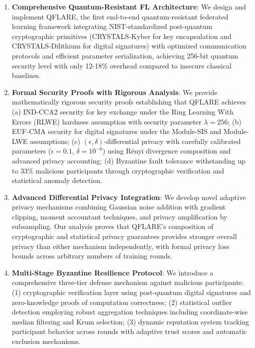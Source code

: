 \documentclass[journal]{IEEEtran}
\begin{document}
\begin{enumerate}
\item \textbf{Comprehensive Quantum-Resistant FL Architecture}: We design and implement QFLARE, the first end-to-end quantum-resistant federated learning framework integrating NIST-standardized post-quantum cryptographic primitives (CRYSTALS-Kyber for key encapsulation and CRYSTALS-Dilithium for digital signatures) with optimized communication protocols and efficient parameter serialization, achieving 256-bit quantum security level with only 12-18\% overhead compared to insecure classical baselines.

\item \textbf{Formal Security Proofs with Rigorous Analysis}: We provide mathematically rigorous security proofs establishing that QFLARE achieves (a) IND-CCA2 security for key exchange under the Ring Learning With Errors (RLWE) hardness assumption with security parameter $\lambda = 256$; (b) EUF-CMA security for digital signatures under the Module-SIS and Module-LWE assumptions; (c) $(\epsilon, \delta)$-differential privacy with carefully calibrated parameters ($\epsilon = 0.1$, $\delta = 10^{-6}$) using Rényi divergence composition and advanced privacy accounting; (d) Byzantine fault tolerance withstanding up to 33\% malicious participants through cryptographic verification and statistical anomaly detection.

\item \textbf{Advanced Differential Privacy Integration}: We develop novel adaptive privacy mechanisms combining Gaussian noise addition with gradient clipping, moment accountant techniques, and privacy amplification by subsampling. Our analysis proves that QFLARE's composition of cryptographic and statistical privacy guarantees provides stronger overall privacy than either mechanism independently, with formal privacy loss bounds across arbitrary numbers of training rounds.

\item \textbf{Multi-Stage Byzantine Resilience Protocol}: We introduce a comprehensive three-tier defense mechanism against malicious participants: (1) cryptographic verification layer using post-quantum digital signatures and zero-knowledge proofs of computation correctness; (2) statistical outlier detection employing robust aggregation techniques including coordinate-wise median filtering and Krum selection; (3) dynamic reputation system tracking participant behavior across rounds with adaptive trust scores and automatic exclusion mechanisms.


\end{enumerate}
\end{document}
